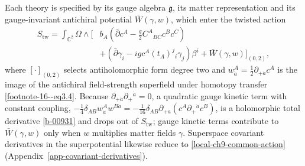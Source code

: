 \documentclass[11pt]{article}
\numberwithin{equation}{section}
\numberwithin{figure}{section}
\numberwithin{table}{section}
\begin{document}
Each theory is specified by its gauge algebra $\mathfrak g$, its matter representation and its gauge-invariant antichiral potential $\bar W(\gamma,w)$, which enter the twisted action
\begin{equation}\label{local-ch9-common-action}
\begin{aligned}
S_{\mathrm{tw}}=\int_{\mathbb C^2}\Omega\wedge\Big[
&b_A\left(\bar\partial c^A-\frac g2C^A{}_{BC}c^Bc^C\right)\\
&+\left(\bar\partial\gamma_i-igc^A(t_A)^j{}_i\gamma_j\right)\beta^i
+\bar W(\gamma,w)\Big]_{(0,2)},
\end{aligned}
\end{equation}
where $[\cdot]_{(0,2)}$ selects antiholomorphic form degree two and $w_{\dot a}^A=\tfrac12\partial_{+\dot a}c^A$ is the image of the antichiral field-strength superfield under homotopy transfer \eqref{footnote-16--eq3.4}. Because $\partial_{+\dot a}\partial_+{}^{\dot a}=0$, a quadratic gauge kinetic term with constant coupling, $-\tfrac14\delta_{AB}w_{\dot a}^Aw^{B\dot a}=-\tfrac1{16}\delta_{AB}\partial_{+\dot a}(c^A\partial_+{}^{\dot a}c^B)$, is a holomorphic total derivative \eqref{b-00931} and drops out of $S_{\mathrm{tw}}$; gauge kinetic terms contribute to $\bar W(\gamma,w)$ only when $w$ multiplies matter fields $\gamma$. Superspace covariant derivatives in the superpotential likewise reduce to \eqref{local-ch9-common-action} (Appendix~\ref{app-covariant-derivatives}).
\end{document}

